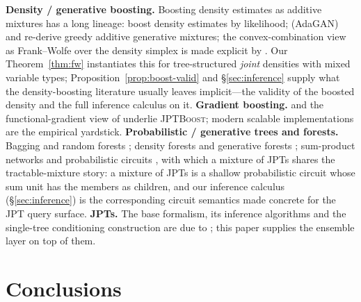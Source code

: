 \documentclass[11pt]{article}
\theoremstyle{plain}
\theoremstyle{definition}
\theoremstyle{remark}
\newcommand{\jptboost}{\textsc{JPTBoost}}
\begin{document}
\textbf{Density / generative boosting.}
Boosting density estimates as additive mixtures has a long lineage:
\citet{rosset2002boostdensity} boost density estimates by likelihood;
\citet{tolstikhin2017adagan} (AdaGAN) and \citet{grover2018boosted}
re-derive greedy additive generative mixtures; the convex-combination view
as Frank--Wolfe over the density simplex is made explicit by
\citet{cranko2019boosting}. Our Theorem~\ref{thm:fw} instantiates this for
tree-structured \emph{joint} densities with mixed variable types;
Proposition~\ref{prop:boost-valid} and \S\ref{sec:inference} supply what
the density-boosting literature usually leaves implicit---the validity of
the boosted density and the full inference calculus on it.
\textbf{Gradient boosting.} \citet{friedman2001gbm} and the
functional-gradient view of \citet{mason2000boosting} underlie \jptboost;
modern scalable implementations \citep{chen2016xgboost,ke2017lightgbm} are
the empirical yardstick. \textbf{Probabilistic / generative trees and
forests.} Bagging and random forests
\citep{breiman1996bagging,breiman2001rf}; density forests and generative
forests \citep{criminisi2012decision,correia2020joints}; sum-product
networks and probabilistic circuits \citep{poon2011spn,choi2020pc}, with
which a mixture of JPTs shares the tractable-mixture story: a mixture of
JPTs is a shallow probabilistic circuit whose sum unit has the members as
children, and our inference calculus (\S\ref{sec:inference}) is the
corresponding circuit semantics made concrete for the JPT query surface.
\textbf{JPTs.} The base formalism, its inference algorithms and the
single-tree conditioning construction are due to \citet{nyga2023jpt};
this paper supplies the ensemble layer on top of them.

\section{Conclusions}
\label{sec:conclusion}
\end{document}
